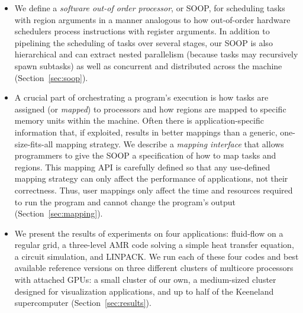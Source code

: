 \documentclass[conference]{IEEEtran}
\begin{document}
\begin{itemize}

\item We define a {\em software out-of order processor}, or SOOP, for scheduling tasks with region arguments in a manner
analogous to how out-of-order hardware schedulers process instructions with register arguments.  In addition to pipelining
the scheduling of tasks over several stages, our SOOP is also hierarchical and can extract nested parallelism (because tasks may recursively spawn subtasks) as well as concurrent and distributed across the machine (Section~\ref{sec:soop}). 

\item A crucial part of orchestrating a program's execution is how
tasks are assigned (or {\em mapped}) to processors and how regions are
mapped to specific memory units within the machine.  Often there is
application-specific information that, if exploited, results in better
mappings than a generic, one-size-fits-all mapping strategy.  We describe
a {\em mapping interface} that allows programmers to give the SOOP a specification
of how to map tasks and regions.  This mapping API is carefully defined so that
any use-defined mapping strategy can only affect the performance of applications,
not their correctness.  Thus, user mappings only affect the time and resources required
to run the program and cannot change the program's output (Section~\ref{sec:mapping}).

\item We present the results of experiments on four applications: fluid-flow on a regular grid,
a three-level AMR code solving a simple heat transfer equation, a circuit simulation,
and LINPACK.  We run each of these four codes and best available reference versions on three different
clusters of multicore processors with attached GPUs: a small cluster of our own, a medium-sized cluster designed for visualization applications, and up to half of the Keeneland supercomputer (Section~\ref{sec:results}).


\end{itemize}
%

%

%
%

%
%

%
%
%
%

{
\tiny

}
\end{document}
